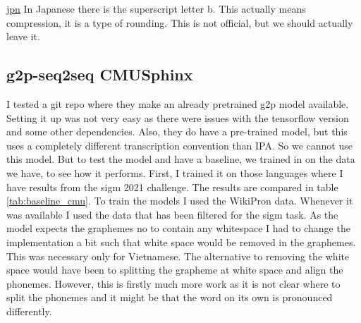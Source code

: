 \href{https://en.wikipedia.org/wiki/Roundedness}{jpn} In Japanese there is the superscript letter b. This actually means compression, it is a type of rounding. This is not official, but we should actually leave it. 

\subsection{g2p-seq2seq CMUSphinx}
I tested a git repo where they make an already pretrained \ac{g2p} model available. Setting it up was not very easy as there were issues with the tensorflow version and some other dependencies. Also, they do have a pre-trained model, but this uses a completely different transcription convention than IPA. So we cannot use this model. But to test the model and have a baseline, we trained in on the data we have, to see how it performs. First, I trained it on those languages where I have results from the \ac{sigm} 2021 challenge. The results are compared in table \ref{tab:baseline_cmu}. To train the models I used the WikiPron data. Whenever it was available I used the data that has been filtered for the \ac{sigm} task. As the model expects the graphemes no to contain any whitespace I had to change the implementation a bit such that white space would be removed in the graphemes. This was necessary only for Vietnamese. The alternative to removing the white space would have been to splitting the grapheme at white space and align the phonemes. However, this is firstly much more work as it is not clear where to split the phonemes and it might be that the word on its own is pronounced differently. 




